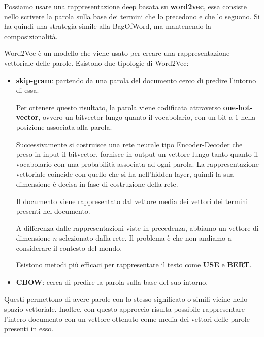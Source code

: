 Possiamo usare una rappresentazione deep basata su \textbf{word2vec}, essa consiste
nello scrivere la parola sulla base dei termini che lo precedono e che lo seguono.
Si ha quindi una strategia simile alla BagOfWord, ma mantenendo la composizionalità.

Word2Vec è un modello che viene usato per creare una rappresentazione vettoriale
delle parole. Esistono due tipologie di Word2Vec:
\begin{itemize}
      \item \textbf{skip-gram}: partendo da una parola del documento cerco di
            predire l'intorno di essa.

            Per ottenere questo risultato, la parola viene codificata attraverso
            \textbf{one-hot-vector}, ovvero un bitvector lungo quanto il
            vocabolario, con un bit a $1$ nella posizione associata alla parola.

            Successivamente si costruisce una rete neurale tipo Encoder-Decoder
            che preso in input il bitvector, fornisce in output un vettore
            lungo tanto quanto il vocabolario con una probabilità associata ad
            ogni parola. La rappresentazione vettoriale coincide con quello che
            si ha nell'hidden layer, quindi la sua dimensione è decisa in fase di
            costruzione della rete.

            Il documento viene rappresentato dal vettore media dei vettori dei
            termini presenti nel documento.

            A differenza dalle rappresentazioni viste in precedenza, abbiamo un
            vettore di dimensione $n$ selezionato dalla rete. Il problema è che
            non andiamo a considerare il contesto del mondo.

            Esistono metodi più efficaci per rappresentare il testo come
            \textbf{USE} e \textbf{BERT}.
      \item \textbf{CBOW}: cerca di predire la parola sulla base del suo intorno.
\end{itemize}
Questi permettono di avere parole con lo stesso significato o simili vicine nello
spazio vettoriale. Inoltre, con questo approccio risulta possibile rappresentare
l'intero documento con un vettore ottenuto come media dei vettori delle parole
presenti in esso.

